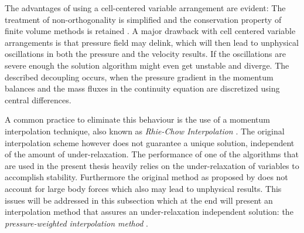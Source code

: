   The advantages of using a cell-centered variable arrangement are evident: The treatment of non-orthogonality is simplified and the conservation property of finite volume methods is retained \cite{choi99,majumdar88,miller88,zhang14}. A major drawback with cell centered variable arrangements is that pressure field may delink, which will then lead to unphysical oscillations in both the pressure and the velocity results. If the oscillations are severe enough the solution algorithm might even get unstable and diverge. The described decoupling occurs, when the pressure gradient in the momentum balances and the mass fluxes in the continuity equation are discretized using central differences. 
  
  A common practice to eliminate this behaviour is the use of a momentum interpolation technique, also known as \emph{Rhie-Chow Interpolation} \cite{rhie82}. The original interpolation scheme however does not guarantee a unique solution, independent of the amount of under-relaxation. The performance of one of the algorithms that are used in the present thesis heavily relies on the under-relaxation of variables to accomplish stability. Furthermore the original method as proposed by \cite{rhie82} does not account for large body forces which also may lead to unphysical results. This issues will be addressed in this subsection which at the end will present an interpolation method that assures an under-relaxation independent solution: the \emph{pressure-weighted interpolation method} \cite{miller88}.

